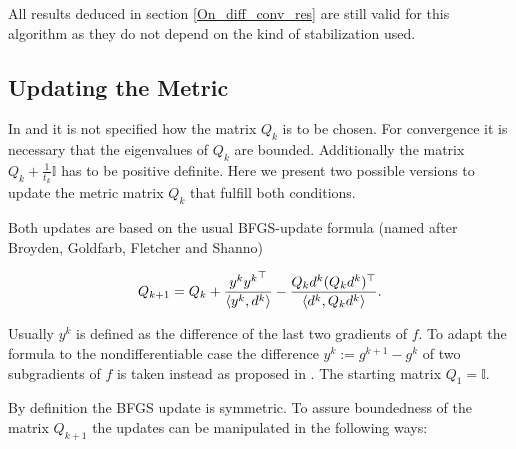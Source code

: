\begin{remark}
	All results deduced in section \ref{On_diff_conv_res} are still valid for this algorithm as they do not depend on the kind of stabilization used.
\end{remark}

\subsection{Updating the Metric}
\label{sec_upd_Q}



In \cite{Noll2012} and \cite{Noll2013} it is not specified how the matrix \(Q_k\) is to be chosen.
For convergence it is necessary that the eigenvalues of \(Q_k\) are bounded. Additionally the matrix \(Q_k+\frac{1}{t_k}\mathbb{I}\) has to be positive definite.
Here we present two possible versions to update the metric matrix \(Q_k\) that fulfill both conditions.

Both updates are based on the usual BFGS-update formula (named after Broyden, Goldfarb, Fletcher and Shanno)

\begin{equation}
	Q_{k+1} = Q_k + \frac{y^k{y^k}^{\top}}{\left\langle y^k,d^k\right\rangle}-\frac{Q_kd^k(Q_kd^k)^{\top}}{\left\langle d^k,Q_kd^k \right\rangle}.
	\label{BFGS_update}
\end{equation}

Usually \(y^k\) is defined as the difference of the last two gradients of \(f\). To adapt the formula to the nondifferentiable case the difference \(y^k := g^{k+1}-g^k\) of two subgradients of \(f\) is taken instead as proposed in \cite{Haarala2007}.
The starting matrix \(Q_1 = \mathbb{I}\).


By definition the BFGS update is symmetric. To assure boundedness of the matrix \(Q_{k+1}\) the updates can be manipulated in the following ways:

